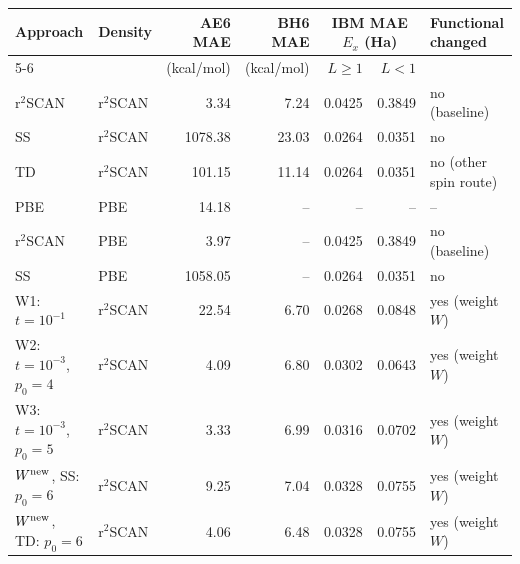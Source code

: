 \begin{tabular}{@{}llrrrrl@{}}
\toprule
Approach & Density & AE6 MAE & BH6 MAE & \multicolumn{2}{c}{IBM MAE $E_x$ (Ha)} & Functional changed \\
\cmidrule(lr){5-6}
 & & (kcal/mol) & (kcal/mol) & $L\geq1$ & $L<1$ & \\
\midrule
r$^2$SCAN & r$^2$SCAN & \textcolor{pyscfred}{3.34} & \textcolor{pyscfred}{7.24} & \textcolor{pyscfred}{0.0425} & \textcolor{pyscfred}{0.3849} & no (baseline) \\
SS & r$^2$SCAN & \textcolor{pyscfred}{1078.38} & \textcolor{pyscfred}{23.03} & \textcolor{pyscfred}{0.0264} & \textcolor{pyscfred}{0.0351} & no \\
TD & r$^2$SCAN & \textcolor{pyscfred}{101.15} & \textcolor{pyscfred}{11.14} & \textcolor{pyscfred}{0.0264} & \textcolor{pyscfred}{0.0351} & no (other spin route) \\
PBE & PBE & \textcolor{pyscfred}{14.18} & -- & -- & -- & -- \\
r$^2$SCAN & PBE & \textcolor{pyscfred}{3.97} & -- & \textcolor{pyscfred}{0.0425} & \textcolor{pyscfred}{0.3849} & no (baseline) \\
SS & PBE & \textcolor{pyscfred}{1058.05} & -- & \textcolor{pyscfred}{0.0264} & \textcolor{pyscfred}{0.0351} & no \\
W1: $t{=}10^{-1}$ & r$^2$SCAN & \textcolor{pyscfred}{22.54} & \textcolor{pyscfred}{6.70} & \textcolor{pyscfred}{0.0268} & \textcolor{pyscfred}{0.0848} & yes (weight $W$) \\
W2: $t{=}10^{-3}$, $p_0{=}4$ & r$^2$SCAN & \textcolor{pyscfred}{4.09} & \textcolor{pyscfred}{6.80} & \textcolor{pyscfred}{0.0302} & \textcolor{pyscfred}{0.0643} & yes (weight $W$) \\
W3: $t{=}10^{-3}$, $p_0{=}5$ & r$^2$SCAN & \textcolor{pyscfred}{3.33} & \textcolor{pyscfred}{6.99} & \textcolor{pyscfred}{0.0316} & \textcolor{pyscfred}{0.0702} & yes (weight $W$) \\
$W^{\rm new}$, SS: $p_0{=}6$ & r$^2$SCAN & \textcolor{pyscfred}{9.25} & \textcolor{pyscfred}{7.04} & \textcolor{pyscfred}{0.0328} & \textcolor{pyscfred}{0.0755} & yes (weight $W$) \\
$W^{\rm new}$, TD: $p_0{=}6$ & r$^2$SCAN & \textcolor{pyscfred}{4.06} & \textcolor{pyscfred}{6.48} & \textcolor{pyscfred}{0.0328} & \textcolor{pyscfred}{0.0755} & yes (weight $W$) \\
\bottomrule
\end{tabular}
